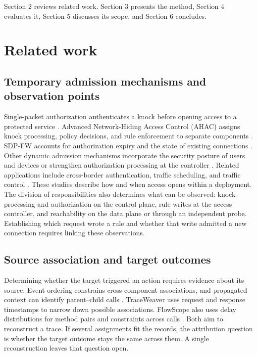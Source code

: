 Section 2 reviews related work. Section 3 presents the method, Section 4 evaluates it, Section 5 discusses its scope, and Section 6 concludes.

\section{Related work}\label{related-work}

\subsection{Temporary admission mechanisms and observation points}\label{temporary-admission-mechanisms-and-observation-points}

Single-packet authorization authenticates a knock before opening access to a protected service \citep{r13}. Advanced Network-Hiding Access Control (AHAC) assigns knock processing, policy decisions, and rule enforcement to separate components \citep{r1}. SDP-FW accounts for authorization expiry and the state of existing connections \citep{r14}. Other dynamic admission mechanisms incorporate the security posture of users and devices or strengthen authorization processing at the controller \citep{r15,r16}. Related applications include cross-border authentication, traffic scheduling, and traffic control \citep{r17,r18,r19}. These studies describe how and when access opens within a deployment. The division of responsibilities also determines what can be observed: knock processing and authorization on the control plane, rule writes at the access controller, and reachability on the data plane or through an independent probe. Establishing which request wrote a rule and whether that write admitted a new connection requires linking these observations.

\subsection{Source association and target outcomes}\label{source-association-and-target-outcomes}

Determining whether the target triggered an action requires evidence about its source. Event ordering constrains cross-component associations, and propagated context can identify parent--child calls \citep{r20,r21}. TraceWeaver uses request and response timestamps to narrow down possible associations. FlowScope also uses delay distributions for method pairs and constraints across calls \citep{r3,r4}. Both aim to reconstruct a trace. If several assignments fit the records, the attribution question is whether the target outcome stays the same across them. A single reconstruction leaves that question open.

